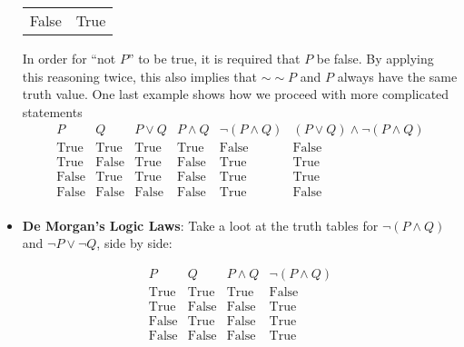 \documentclass{report}
\begin{document}
\begin{itemize}
\begin{center}
\begin{tabular}{c|c}
                    False & True
                \end{tabular}
            \end{center}
            In order for ``not $P$'' to be true, it is required that $P$ be false. By applying this reasoning twice, this also implies that $\sim\sim P$ and $P$ always have the same truth value.
            \bigbreak \noindent 
            One last example shows how we proceed with more complicated statements
            \[
                \begin{array}{c|c|c|c|c|c}
                    \hline
                    P & Q & P \vee Q & P \wedge Q & \neg (P \wedge Q) & (P \vee Q) \wedge \neg (P \wedge Q) \\
                    \hline
                    \text{True} & \text{True} & \text{True} & \text{True} & \text{False} & \text{False} \\
                    \text{True} & \text{False} & \text{True} & \text{False} & \text{True} & \text{True} \\
                    \text{False} & \text{True} & \text{True} & \text{False} & \text{True} & \text{True} \\
                    \text{False} & \text{False} & \text{False} & \text{False} & \text{True} & \text{False} \\
                \end{array}
            \]
        \item \textbf{De Morgan’s Logic Laws}: Take a loot at the truth tables for $\neg(P \land Q)$ and $\neg P \lor \neg Q$, side by side:
            \begin{multicols}{2}
                \[
                    \begin{array}{c|c|c|c}
                        P & Q & P \land Q & \neg(P \land Q) \\
                        \hline
                        \text{True} & \text{True} & \text{True} & \text{False} \\
                        \text{True} & \text{False} & \text{False} & \text{True} \\
                        \text{False} & \text{True} & \text{False} & \text{True} \\
                        \text{False} & \text{False} & \text{False} & \text{True} \\
                    \end{array}
                \]


\end{multicols}
\end{itemize}
\end{document}
